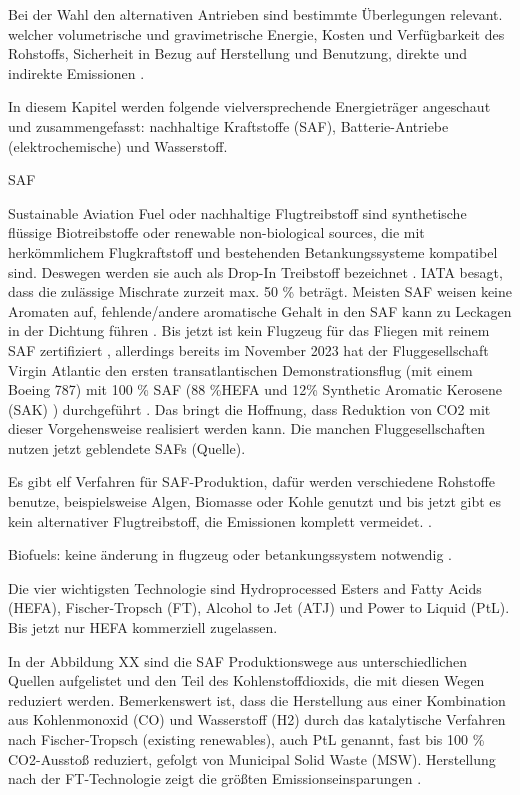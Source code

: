 

Bei der Wahl den alternativen Antrieben sind bestimmte Überlegungen relevant. welcher volumetrische und gravimetrische Energie, Kosten 
und Verfügbarkeit des Rohstoffs, Sicherheit in Bezug auf Herstellung und Benutzung, 
direkte und indirekte  Emissionen \cite{ansell2023review}.



In diesem Kapitel werden folgende vielversprechende Energieträger angeschaut und zusammengefasst: nachhaltige Kraftstoffe (SAF), 
Batterie-Antriebe (elektrochemische) und Wasserstoff.





SAF

Sustainable Aviation Fuel oder nachhaltige Flugtreibstoff sind synthetische flüssige Biotreibstoffe oder renewable non-biological sources, 
die mit herkömmlichem Flugkraftstoff und bestehenden Betankungssysteme kompatibel sind. Deswegen werden sie auch als Drop-In Treibstoff bezeichnet
\cite{iata_saf_2024}. IATA besagt, dass die zulässige Mischrate zurzeit max. 50 \% beträgt. Meisten SAF weisen keine Aromaten auf, 
fehlende/andere aromatische Gehalt in den SAF kann zu Leckagen in der Dichtung führen \cite{jarin2024emissions}. 
Bis jetzt ist kein Flugzeug für das Fliegen mit reinem SAF zertifiziert \cite{iata_saf_2024}, 
allerdings bereits im November 2023 hat der Fluggesellschaft Virgin Atlantic den ersten transatlantischen Demonstrationsflug 
(mit einem Boeing 787) mit 100 \% SAF (88 \%HEFA und 12\% Synthetic Aromatic Kerosene (SAK) ) durchgeführt \cite{virginatlantic_saf_2023}.
Das bringt die Hoffnung, dass Reduktion von CO2 mit dieser Vorgehensweise realisiert werden kann. Die manchen Fluggesellschaften nutzen jetzt
geblendete SAFs (Quelle). 

Es gibt elf Verfahren für SAF-Produktion, dafür werden verschiedene Rohstoffe benutze, beispielsweise Algen, Biomasse oder Kohle 
genutzt und bis jetzt gibt es kein alternativer Flugtreibstoff, die Emissionen komplett vermeidet. \cite{icao_saf_conversion_2024}.

Biofuels: keine änderung in flugzeug oder betankungssystem notwendig \cite{sky2020hydrogen}.

Die vier wichtigsten Technologie sind Hydroprocessed Esters and Fatty Acids (HEFA), Fischer-Tropsch (FT), Alcohol to Jet (ATJ) 
und Power to Liquid (PtL). Bis jetzt nur HEFA kommerziell zugelassen.

In der Abbildung XX sind die SAF Produktionswege aus unterschiedlichen Quellen aufgelistet und den Teil des Kohlenstoffdioxids,
die mit diesen Wegen reduziert werden. Bemerkenswert ist, dass die Herstellung
aus einer Kombination aus Kohlenmonoxid (CO) und Wasserstoff (H2) durch das katalytische Verfahren nach Fischer-Tropsch (existing renewables), 
auch PtL genannt, fast bis 100 \% CO2-Ausstoß reduziert, gefolgt von Municipal Solid Waste (MSW). 
Herstellung nach der FT-Technologie zeigt die größten Emissionseinsparungen \cite{iata_saf_2024, de2017life}.

